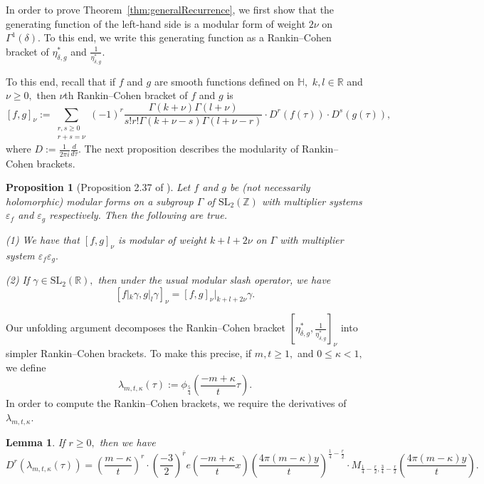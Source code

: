 \documentclass[10pt]{amsart}
\newtheorem{lemma}[theorem]{Lemma}
\newtheorem{proposition}[theorem]{Proposition}
\theoremstyle{definition}
\theoremstyle{remark}
\numberwithin{equation}{section}
\newcommand{\R}{\mathbb R}
\newcommand{\lam}{\lambda}
\newcommand{\HH}{\mathbb H}
\newcommand{\SL}{\mathrm{SL}}
\newcommand{\Z}{\mathbb Z}
\begin{document}
	In order to prove Theorem~\ref{thm:generalRecurrence}, we first show that the generating function of the left-hand side is a modular form of weight $2\nu$ on $\Gamma^1(\delta).$ To this end, we write this generating function as a Rankin--Cohen bracket of $\eta_{\delta,g}^\ast$ and $\frac{1}{\eta_{\delta,g}^\ast}.$ 
	
	To this end, recall that if $f$ and $g$ are smooth functions defined on $\HH,$  $k,l\in\R$ and $\nu\geq 0,$ then $\nu$th Rankin--Cohen bracket of $f$ and $g$ is
	\begin{equation}\label{RankinCohenDefinition}
	[f,g]_\nu :=  \sum_{\substack{r,s \geq 0 \\ r + s = \nu}} (-1)^r \frac{\Gamma(k+\nu)\Gamma(l+\nu)}{s!r!\Gamma(k+\nu-s)\Gamma(l+\nu-r)}\cdot D^r(f(\tau)) \cdot D^s(g(\tau)),
\end{equation}
where $D:=\frac{1}{2\pi i}\frac{d}{d\tau}.$
	The next proposition describes the modularity of Rankin--Cohen brackets. 
	\begin{proposition}[Proposition 2.37 of \cite{HMFBook}]\label{RankinCohenModularity}
	Let $f$ and $g$ be (not necessarily holomorphic) modular forms on a subgroup $\Gamma$ of $\SL_2(\Z)$ with multiplier systems $\varepsilon_f$ and $\varepsilon_g$ respectively. Then the following are true.
	
	\noindent
	(1)  We have that $[f,g]_\nu$ is modular of weight $k+l+2\nu$ on $\Gamma$ with multiplier system $\varepsilon_f\varepsilon_g.$
	
	\noindent
	(2)  If $\gamma\in\SL_2(\R),$ then under the usual modular slash operator, we have
	$$
	[f|_k\gamma,g|_l\gamma]_\nu=[f,g]_\nu|_{k+l+2\nu}\gamma.
	$$
\end{proposition}

	Our unfolding argument decomposes the Rankin--Cohen bracket $\left[\eta_{\delta,g}^\ast,\frac{1}{\eta_{\delta,g}^\ast}\right]_\nu$ into simpler Rankin--Cohen brackets. To make this precise, if  $m,t\geq 1,$ and $0\leq\kappa<1,$  we define
	$$
	\lam_{m,t,\kappa}(\tau):= \phi_{\frac{5}{4}}\left(\frac{-m+\kappa}{t}\tau\right).
	$$
	In order to compute the Rankin--Cohen brackets, we require the derivatives of $\lambda_{m,t,\kappa}.$ 
	
		\begin{lemma}\label{lem:lamDer}
		If $r\geq 0,$ then we have
		$$
		D^r(\lam_{m,t,\kappa}(\tau))=\left(\frac{m-\kappa}{t}\right)^r\cdot\left(\frac{-3}{2}\right)^{\overline{r}}e\left(\frac{-m+\kappa}{t}x\right)\left(\frac{4\pi(m-\kappa)y}{t}\right)^{\frac{1}{4}-\frac{r}{2}}\cdot M_{\frac{1}{4}-\frac{r}{2},\frac{3}{4}-\frac{r}{2}}\left(\frac{4\pi(m-\kappa)y}{t}\right).
		$$
	\end{lemma}
	
\end{document}
